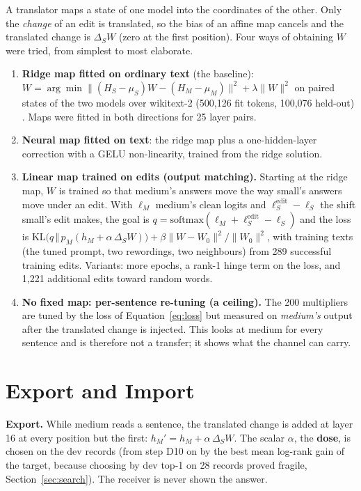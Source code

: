A translator maps a state of one model into the coordinates of the other. Only the \emph{change} of an edit is translated, so the bias of an affine map cancels and the translated change is $\Delta_S W$ (zero at the first position). Four ways of obtaining $W$ were tried, from simplest to most elaborate.
\begin{enumerate}
  \item \textbf{Ridge map fitted on ordinary text} (the baseline): $W=\arg\min \lVert (H_S-\mu_S)W-(H_M-\mu_M)\rVert^2+\lambda\lVert W\rVert^2$ on paired states of the two models over wikitext-2 (500,126 fit tokens, 100,076 held-out) \cite{r45}. Maps were fitted in both directions for 25 layer pairs.
  \item \textbf{Neural map fitted on text}: the ridge map plus a one-hidden-layer correction with a GELU non-linearity, trained from the ridge solution.
  \item \textbf{Linear map trained on edits (output matching).} Starting at the ridge map, $W$ is trained so that medium's answers move the way small's answers move under an edit. With $\ell_M$ medium's clean logits and $\ell_S^{\mathrm{edit}}-\ell_S$ the shift small's edit makes, the goal is $q=\mathrm{softmax}(\ell_M+\ell_S^{\mathrm{edit}}-\ell_S)$ and the loss is $\mathrm{KL}\bigl(q\,\Vert\,p_M(h_M+\alpha\,\Delta_S W)\bigr)+\beta\lVert W-W_0\rVert^2/\lVert W_0\rVert^2$, with training texts (the tuned prompt, two rewordings, two neighbours) from 289 successful training edits. Variants: more epochs, a rank-1 hinge term on the loss, and 1,221 additional edits toward random words.
  \item \textbf{No fixed map: per-sentence re-tuning (a ceiling).} The 200 multipliers are tuned by the loss of Equation~\ref{eq:loss} but measured on \emph{medium's} output after the translated change is injected. This looks at medium for every sentence and is therefore not a transfer; it shows what the channel can carry.
\end{enumerate}

\section{Export and Import}

\textbf{Export.} While medium reads a sentence, the translated change is added at layer 16 at every position but the first: $h_M' = h_M + \alpha\,\Delta_S W$. The scalar $\alpha$, the \textbf{dose}, is chosen on the dev records (from step D10 on by the best mean log-rank gain of the target, because choosing by dev top-1 on 28 records proved fragile, Section~\ref{sec:search}). The receiver is never shown the answer.

